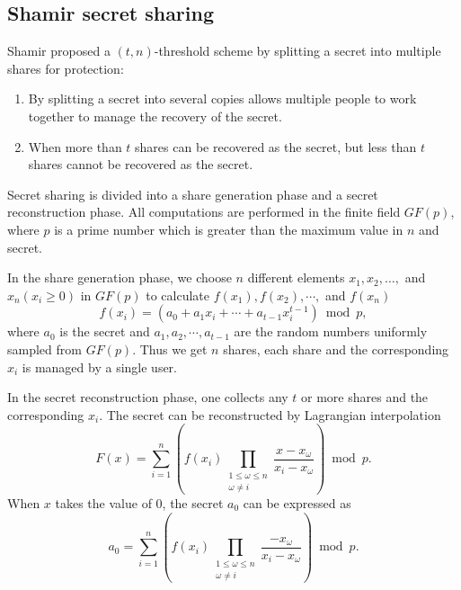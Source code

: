 \subsection{Shamir secret sharing }\label{(2,2)-VC}

Shamir proposed a $(t, n)$-threshold scheme by splitting a secret into multiple shares for protection:

\begin{enumerate}
	\renewcommand{\labelenumi}{(\theenumi)}
	\item By splitting a secret into several copies allows multiple people to work together to manage the recovery of the secret.
	\item When more than $t$ shares can be recovered as the secret, but less than $t$ shares cannot be recovered as the secret.
\end{enumerate}

Secret sharing is divided into a share generation phase and a secret reconstruction phase. All computations are performed in the finite field $GF(p)$, where $p$ is a prime number which is greater than the maximum value in $n$ and secret.

In the share generation phase, we choose $n$ different elements $x_{1}, x_{2},\dots,$ and $x_{n}\left(x_{i} \geq 0\right)$ in $GF(p)$ to calculate $f\left(x_{1}\right), f\left(x_{2}\right), \cdots,$ and $f\left(x_{n}\right)$
\begin{equation}\label{eq1}
f(x_{i} )=\left(a_{0}+a_{1} x_{i}+\cdots+a_{t-1} x_{i}^{t-1}\right) \bmod p,
\end{equation}where $a_{0}$ is the secret and $a_{1},a_{2},\cdots,a_{t-1}$ are the random numbers uniformly sampled from $GF(p)$. Thus we get $n$ shares, each share and the corresponding $x_{i}$ is managed by a single user.

In the secret reconstruction phase, one collects any $t$ or more shares and the corresponding $x_{i}$. The secret can be reconstructed by Lagrangian interpolation
\begin{equation}\label{eq1}
F(x)=\sum_{i=1}^{n}\left(f\left(x_{i}\right) \prod_{\substack{1 \leq \omega \leq n \\ \omega \neq i}} \frac{x-x_{\omega}}{x_{i}-x_{\omega}}\right) \bmod p.
\end{equation}When $x$ takes the value of 0, the secret $a_{0}$ can be expressed as
\begin{equation}\label{eq1}
a_{0}=\sum_{i=1}^{n}\left(f\left(x_{i}\right) \prod_{\substack{1 \leq \omega \leq n \\ \omega \neq i}} \frac{-x_{\omega}}{x_{i}-x_{\omega}}\right) \bmod p.
\end{equation}
